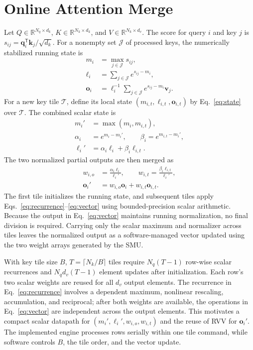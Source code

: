 \documentclass[journal]{IEEEtran}
\begin{document}
\section{Online Attention Merge}
Let $Q\in\mathbb R^{N_q\times d_k}$, $K\in\mathbb R^{N_k\times d_k}$, and
$V\in\mathbb R^{N_k\times d_v}$. The score for query $i$ and key $j$ is
$s_{ij}=\mathbf q_i^{\mathsf T}\mathbf k_j/\sqrt{d_k}$. For a nonempty set
$\mathcal J$ of processed keys, the numerically stabilized running state is
\begin{equation}
\begin{aligned}
m_i&=\max_{j\in\mathcal J}s_{ij},\\
\ell_i&=\sum_{j\in\mathcal J}e^{s_{ij}-m_i},\\
\mathbf o_i&=\ell_i^{-1}\sum_{j\in\mathcal J}e^{s_{ij}-m_i}\mathbf v_j.
\end{aligned}\label{eq:state}
\end{equation}
For a new key tile $\mathcal T$, define its local state
$(m_{i,t},\ell_{i,t},\mathbf o_{i,t})$ by Eq.~\eqref{eq:state} over
$\mathcal T$. The combined scalar state is
\begin{equation}
\begin{aligned}
m_i'&=\max(m_i,m_{i,t}),\\
\alpha_i&=e^{m_i-m_i'},\qquad \beta_i=e^{m_{i,t}-m_i'},\\
\ell_i'&=\alpha_i\ell_i+\beta_i\ell_{i,t}.
\end{aligned}\label{eq:recurrence}
\end{equation}
The two normalized partial outputs are then merged as
\begin{equation}
\begin{aligned}
w_{i,o}&=\frac{\alpha_i\ell_i}{\ell_i'},\qquad
w_{i,t}=\frac{\beta_i\ell_{i,t}}{\ell_i'},\\
\mathbf o_i'&=w_{i,o}\mathbf o_i+w_{i,t}\mathbf o_{i,t}.
\end{aligned}\label{eq:vector}
\end{equation}
The first tile initializes the running state, and subsequent tiles apply
Eqs.~\eqref{eq:recurrence}--\eqref{eq:vector} using bounded-precision scalar
arithmetic. Because the output in Eq.~\eqref{eq:vector} maintains running
normalization, no final division is required. Carrying only the scalar
maximum and normalizer across tiles leaves the normalized output as a
software-managed vector updated using the two weight arrays generated by
the SMU.

With key tile size $B$, $T=\lceil N_k/B\rceil$ tiles require
$N_q(T-1)$ row-wise scalar recurrences and $N_qd_v(T-1)$ element updates
after initialization. Each row's two scalar weights are reused for all
$d_v$ output elements. The recurrence in Eq.~\eqref{eq:recurrence} involves
a dependent maximum, nonlinear rescaling, accumulation, and reciprocal;
after both weights are available, the operations in Eq.~\eqref{eq:vector}
are independent across the output elements. This motivates a compact
scalar datapath for $(m_i',\ell_i',w_{i,o},w_{i,t})$ and the reuse of
RVV for $\mathbf o_i'$. The implemented engine processes rows serially
within one tile command, while software controls $B$, the tile order, and
the vector update.
\end{document}
